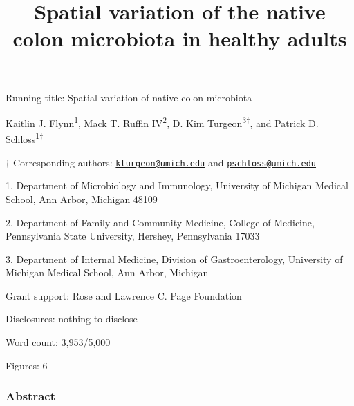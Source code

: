 \documentclass[12pt,]{article}
\title{Spatial variation of the native colon microbiota in healthy adults}
\author{}
\date{}
\begin{document}
\maketitle

\vspace{8mm}

Running title: Spatial variation of native colon microbiota

\vspace{8mm}

Kaitlin J. Flynn\textsuperscript{1}, Mack T. Ruffin
IV\textsuperscript{2}, D. Kim Turgeon\textsuperscript{3\(\dagger\)}, and
Patrick D. Schloss\textsuperscript{1\(\dagger\)}

\vspace{8mm}

\(\dagger\) Corresponding authors:
\href{mailto:kturgeon@umich.edu}{\nolinkurl{kturgeon@umich.edu}} and
\href{mailto:pschloss@umich.edu}{\nolinkurl{pschloss@umich.edu}}

1. Department of Microbiology and Immunology, University of Michigan
Medical School, Ann Arbor, Michigan 48109

2. Department of Family and Community Medicine, College of Medicine,
Pennsylvania State University, Hershey, Pennsylvania 17033

3. Department of Internal Medicine, Division of Gastroenterology,
University of Michigan Medical School, Ann Arbor, Michigan

Grant support: Rose and Lawrence C. Page Foundation

Disclosures: nothing to disclose

Word count: 3,953/5,000

Figures: 6

\newpage

\subsubsection{Abstract}\label{abstract}
\end{document}

